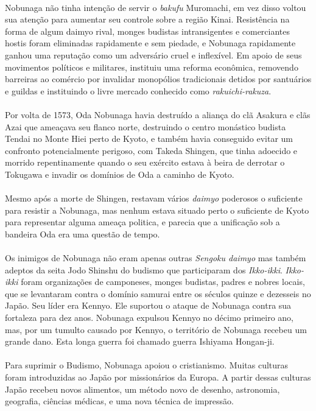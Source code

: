 \documentclass[12pt, a4paper]{article}
\begin{document}
            \\
            \indent Nobunaga não tinha intenção de servir o \textit{bakufu} Muromachi, em vez disso voltou sua atenção para aumentar seu controle sobre a região Kinai. Resistência na forma de algum daimyo rival, monges budistas intransigentes e comerciantes hostis foram eliminadas rapidamente e sem piedade, e Nobunaga rapidamente ganhou uma reputação como um adversário cruel e inflexível. Em apoio de seus movimentos políticos e militares, instituiu uma reforma econômica, removendo barreiras ao comércio por invalidar monopólios tradicionais detidos por santuários e guildas e instituindo o livre mercado conhecido como \textit{rakuichi-rakuza}.\\
            \\
            \indent Por volta de 1573, Oda Nobunaga havia destruído a aliança do clã Asakura e clãs Azai que ameaçava seu flanco norte, destruindo o centro monástico budista Tendai no Monte Hiei perto de Kyoto, e também havia conseguido evitar um confronto potencialmente perigoso, com Takeda Shingen, que tinha adoecido e morrido repentinamente quando o seu exército estava à beira de derrotar o Tokugawa e invadir os domínios de Oda a caminho de Kyoto.\\
            \\
            \indent Mesmo após a morte de Shingen, restavam vários \textit{daimyo} poderosos o suficiente para resistir a Nobunaga, mas nenhum estava situado perto o suficiente de Kyoto para representar alguma ameaça politica, e parecia que a unificação sob a bandeira Oda era uma questão de tempo.\\
            \\
            \indent Os inimigos de Nobunaga não eram apenas outras \textit{Sengoku daimyo} mas também adeptos da seita Jodo Shinshu do budismo que participaram dos \textit{Ikko-ikki}. \textit{Ikko-ikki} foram organizações de camponeses, monges budistas, padres e nobres locais, que se levantaram contra o domínio samurai entre os séculos quinze e dezesseis no Japão. Seu líder era Kennyo. Ele suportou o ataque de Nobunaga contra sua fortaleza para dez anos. Nobunaga expulsou Kennyo no décimo primeiro ano, mas, por um tumulto causado por Kennyo, o território de Nobunaga recebeu um grande dano. Esta longa guerra foi chamado guerra Ishiyama Hongan-ji.\\
            \\
            \indent Para suprimir o Budismo, Nobunaga apoiou o cristianismo. Muitas culturas foram introduzidas ao Japão por missionários da Europa. A partir dessas culturas Japão recebeu novos alimentos, um método novo de desenho, astronomia, geografia, ciências médicas, e uma nova técnica de impressão.\\
\end{document}
